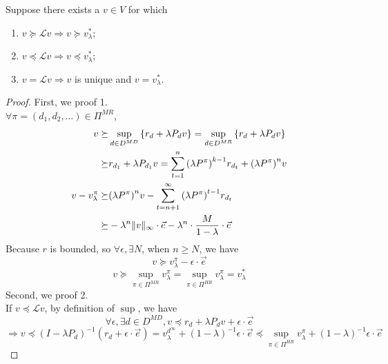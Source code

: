 \begin{theorem}
    Suppose there exists a $ v \in V $ for which
    \begin{enumerate}
        \item $ v \succeq \mathcal{L} v \Rightarrow v \succeq v^*_\lambda $;
        \item $ v \preceq \mathcal{L} v \Rightarrow v \preceq v^*_\lambda$;
        \item $ v = \mathcal{L} v \Rightarrow v $ is unique and $ v = v^*_\lambda $.
    \end{enumerate}
    \begin{proof}
        First, we proof 1.\\
        $ \forall \pi = (d_1, d_2, \ldots) \in \Pi^{MR} $,
        \begin{align*}
            v \succeq& \sup_{d \in D^{MD}} \left\{ r_d + \lambda P_d v \right\} = \sup_{d \in D^{MR}} \left\{ r_d + \lambda P_d v \right\} \\
            \succeq& r_{d_1} + \lambda P_{d_1} v = \sum^{n}_{t=1} {(\lambda P^\pi)}^{k-1} r_{d_t} + {(\lambda P^\pi)}^n v\\
            v - v^\pi_\lambda \succeq& {(\lambda P^\pi)}^n v - \sum^{\infty}_{t = n+1} {(\lambda P^\pi)}^{t-1} r_{d_t} \\
            \succeq& - \lambda^n \Arrowvert v \Arrowvert_{\infty} \cdot \vec e
            - \lambda^n \cdot \frac{M}{1-\lambda} \cdot \vec e
        \end{align*}
        Because $ r $ is bounded, so $ \forall \epsilon, \exists N $, when $ n \ge N $, we have
        \[
            v \succeq v^\pi_\lambda - \epsilon \cdot \vec e
        \]
        \[
            v \succeq \sup_{\pi \in \Pi^{MR}} v^\pi_\lambda = \sup_{\pi \in \Pi^{HR}} v^\pi_\lambda = v^*_\lambda
        \]
        Second, we proof 2.\\
        If $ v \preceq \mathcal{L} v $, by definition of $ \sup $, we have
        \[
            \forall \epsilon, \exists d \in D^{MD}, v \preceq r_d + \lambda P_d v + \epsilon \cdot \vec e 
        \]
        \[
            \Rightarrow v \preceq {(I - \lambda P_d)}^{-1}(r_d + \epsilon \cdot \vec e)
        = v^{d^\infty}_{\lambda} + {(1 - \lambda)}^{-1} \epsilon \cdot \vec e
    \preceq \sup_{\pi \in \Pi^{HR}} v^\pi_{\lambda} + {(1-\lambda)}^{-1} \epsilon \cdot \vec e
        \]
    \end{proof}
\end{theorem}

